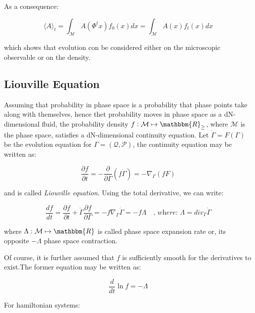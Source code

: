 \documentclass{article}
\begin{document}
As a consequence:

\begin{equation}
\langle A \rangle_t = \int_{ \mathcal{M} } A(\Phi^t x) f_0(x) dx = \int_{ \mathcal{M} } A(x) f_t(x)dx
\end{equation}

which shows that evolution con be considered either on the microscopic observable or on the density.

\newpage

\subsection{Liouville Equation}

Assuming that probability in phase space is a probability that phase points take along with themselves, hence thet probability moves in phase space as a dN-dimensional fluid, the probability density $f: \mathcal{M} \mapsto \mathbbm{R}_{\geq}$, where $\mathcal{M}$ is the phase space, satisfies a dN-dimensional continuity equation.
Let $\dot{\Gamma} = F(\Gamma)$ be the evolution equation for $\Gamma = (\mathcal{Q},\mathcal{P})$, the continuity equation may be written as:

\begin{equation}
\frac{\partial f}{\partial t} = - \frac{\partial}{\partial \Gamma}(f \dot{\Gamma}) = - \nabla_{\Gamma} (f F)
\end{equation}

and is called \emph{Liouville equation}. Using the total derivative, we can write:

\begin{equation}
\frac{df}{dt} = \frac{\partial f}{\partial t} + \dot{\Gamma} \frac{\partial f}{\partial \Gamma} = -f \nabla_{\Gamma} \dot{\Gamma} = -f \Lambda \quad \textit{, where: } \Lambda = \textit{div}_{\Gamma} \dot{\Gamma}
\end{equation}

where $\Lambda : \mathcal{M} \mapsto \mathbbm{R}$ is called phase space expansion rate or, its opposite $-\Lambda$ phase space contraction. 

Of course, it is further assumed that $f$ is sufficiently smooth for the derivatives to exist.The former equation may be written as:

\begin{equation}
\frac{d}{dt} \ln f = - \Lambda
\end{equation}

For hamiltonian systems:
\end{document}
